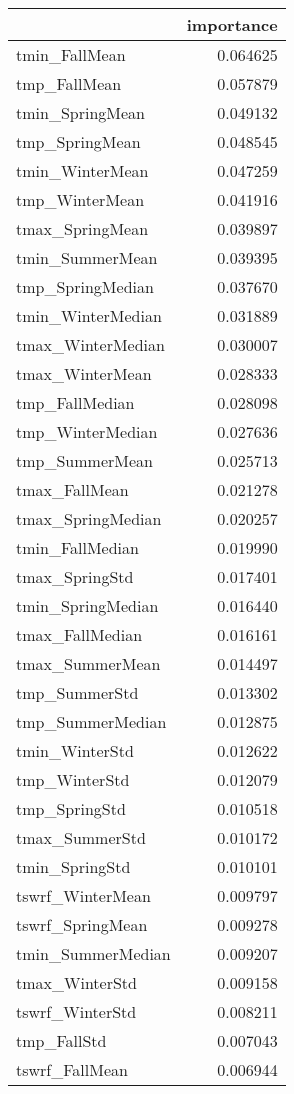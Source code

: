 \begin{tabular}{lr}
\toprule
 & importance \\
\midrule
tmin_FallMean & 0.064625 \\
tmp_FallMean & 0.057879 \\
tmin_SpringMean & 0.049132 \\
tmp_SpringMean & 0.048545 \\
tmin_WinterMean & 0.047259 \\
tmp_WinterMean & 0.041916 \\
tmax_SpringMean & 0.039897 \\
tmin_SummerMean & 0.039395 \\
tmp_SpringMedian & 0.037670 \\
tmin_WinterMedian & 0.031889 \\
tmax_WinterMedian & 0.030007 \\
tmax_WinterMean & 0.028333 \\
tmp_FallMedian & 0.028098 \\
tmp_WinterMedian & 0.027636 \\
tmp_SummerMean & 0.025713 \\
tmax_FallMean & 0.021278 \\
tmax_SpringMedian & 0.020257 \\
tmin_FallMedian & 0.019990 \\
tmax_SpringStd & 0.017401 \\
tmin_SpringMedian & 0.016440 \\
tmax_FallMedian & 0.016161 \\
tmax_SummerMean & 0.014497 \\
tmp_SummerStd & 0.013302 \\
tmp_SummerMedian & 0.012875 \\
tmin_WinterStd & 0.012622 \\
tmp_WinterStd & 0.012079 \\
tmp_SpringStd & 0.010518 \\
tmax_SummerStd & 0.010172 \\
tmin_SpringStd & 0.010101 \\
tswrf_WinterMean & 0.009797 \\
tswrf_SpringMean & 0.009278 \\
tmin_SummerMedian & 0.009207 \\
tmax_WinterStd & 0.009158 \\
tswrf_WinterStd & 0.008211 \\
tmp_FallStd & 0.007043 \\
tswrf_FallMean & 0.006944 \\

\end{tabular}
